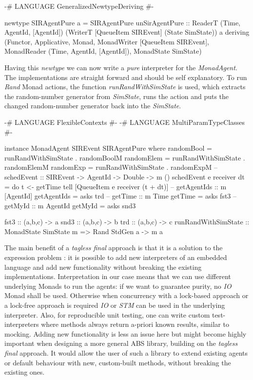 \begin{HaskellCode}
{-# LANGUAGE GeneralizedNewtypeDeriving #-}

newtype SIRAgentPure a = SIRAgentPure 
  { unSirAgentPure :: ReaderT (Time, AgentId, [AgentId]) 
                        (WriterT [QueueItem SIREvent]
                          (State SimState)) a}
  deriving (Functor, Applicative, Monad, 
            MonadWriter [QueueItem SIREvent],
            MonadReader (Time, AgentId, [AgentId]),
            MonadState SimState)
\end{HaskellCode}

Having this \textit{newtype} we can now write a \textit{pure} interpreter for the \textit{MonadAgent}. The implementations are straight forward and should be self explanatory. To run \textit{Rand} Monad actions, the function \textit{runRandWithSimState} is used, which extracts the random-number generator from \textit{SimState}, runs the action and puts the changed random-number generator back into the \textit{SimState}.

\begin{HaskellCode}   
{-# LANGUAGE FlexibleContexts           #-}
{-# LANGUAGE MultiParamTypeClasses      #-}
      
instance MonadAgent SIREvent SIRAgentPure where
  randomBool = runRandWithSimState . randomBoolM
  randomElem = runRandWithSimState . randomElemM
  randomExp  = runRandWithSimState . randomExpM
  -- schedEvent :: SIREvent -> AgentId -> Double -> m ()
  schedEvent e receiver dt = do
    t <- getTime 
    tell [QueueItem e receiver (t + dt)]
  -- getAgentIds :: m [AgentId]
  getAgentIds = asks trd
  -- getTime :: m Time
  getTime = asks fst3
  -- getMyId :: m AgentId
  getMyId = asks snd3

fst3 :: (a,b,c) -> a
snd3 :: (a,b,c) -> b
trd :: (a,b,c) -> c
runRandWithSimState :: MonadState SimState m => Rand StdGen a -> m a
\end{HaskellCode}

The main benefit of a \textit{tagless final} approach is that it is a solution to the expression problem \cite{kiselyov_typed_2012}: it is possible to add new interpreters of an embedded language and add new functionality without breaking the existing implementations. Interpretation in our case means that we can use different underlying Monads to run the agents: if we want to guarantee purity, no \textit{IO} Monad shall be used. Otherwise when concurrency with a lock-based approach or a lock-free approach is required \textit{IO} or \textit{STM} can be used in the underlying interpreter. Also, for reproducible unit testing, one can write custom test-interpreters where methods always return a-priori known results, similar to mocking. Adding new functionality is less an issue here but might become highly important when designing a more general ABS library, building on the \textit{tagless final} approach. It would allow the user of such a library to extend existing agents or default behaviour with new, custom-built methods, without breaking the existing ones.